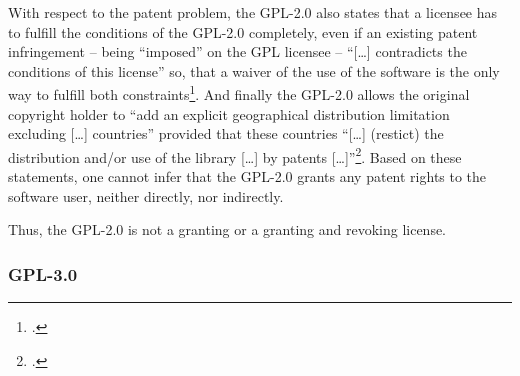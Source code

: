With respect to the patent problem, the GPL-2.0 also states that a licensee has
to fulfill the conditions of the GPL-2.0 completely, even if an existing patent
infringement -- being \enquote{imposed} on the GPL licensee -- \enquote{[\ldots]
contradicts the conditions of this license} so, that a waiver of the use of the
software is the only way to fulfill both constraints\footcite[cf.][\nopage wp.\
§11]{Gpl20OsiLicense1991a}. And finally the GPL-2.0 allows the original
copyright holder to \enquote{add an explicit geographical distribution
limitation excluding [\ldots] countries} provided that these countries
\enquote{[\ldots] (restict) the distribution and/or use of the library [\ldots]
by patents [\ldots]}\footcite[cf.][\nopage wp.\ §12]{Gpl20OsiLicense1991a}.
Based on these statements, one cannot infer that the GPL-2.0 grants any patent
rights to the software user, neither directly, nor indirectly.

Thus, the GPL-2.0 is not a granting or a granting and revoking license.

\subsubsection {GPL-3.0}\label{subsec:Gpl30PatentClause}

